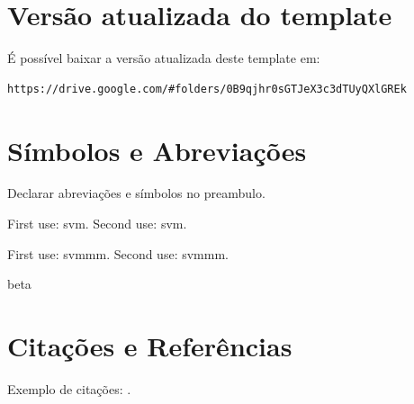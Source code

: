 \documentclass[a4paper,12pt]{udesc}
\begin{document}





%






\chapter{Versão atualizada do template}

É possível baixar a versão atualizada deste template em:










\begin{verbatim}
https://drive.google.com/#folders/0B9qjhr0sGTJeX3c3dTUyQXlGREk
\end{verbatim}



\chapter{Símbolos e Abreviações}

Declarar abreviações e símbolos no preambulo.


First use: \gls{svm}. Second use: \gls{svm}.

First use: \gls{svmmm}. Second use: \gls{svmmm}.



\gls{beta}








\chapter{Citações e Referências}

Exemplo de citações: \cite{RW89}.
\end{document}
